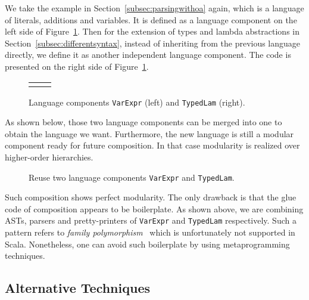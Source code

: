 We take the example in Section~\ref{subsec:parsingwithoa} again, which is a language of literals, additions and variables. It is defined as a
language component on the left side of Figure~\ref{fig:lng-components}.
Then for the extension of types and lambda abstractions in Section~\ref{subsec:differentsyntax}, instead of inheriting from the previous language directly, we define it as another independent language component. The code is presented on the right side of Figure~\ref{fig:lng-components}.

\begin{figure}[t]
\begin{tabular}{m{0.42\linewidth}m{0.52\linewidth}}
&
\end{tabular}
\caption{Language components \lstinline{VarExpr} (left) and \lstinline{TypedLam} (right).}\label{fig:lng-components}
\end{figure}

As shown below, those two language components can be merged into one to obtain the language we want. Furthermore, the new language is still a modular
component ready for future composition. In that case modularity is realized over higher-order hierarchies.

\begin{figure}[t]
\caption{Reuse two language components \lstinline{VarExpr} and \lstinline{TypedLam}.}\label{fig:compose-components}
\end{figure}

Such composition shows perfect modularity. The only
drawback is that the glue code of composition appears to be boilerplate. As shown above, we are combining ASTs, parsers and pretty-printers of
\lstinline{VarExpr} and \lstinline{TypedLam} respectively. Such a pattern refers to \textit{family polymorphism}~\cite{ernst01FP} which is unfortunately not supported in Scala. Nonetheless, one can avoid such boilerplate by using metaprogramming techniques.

\subsection{Alternative Techniques}


